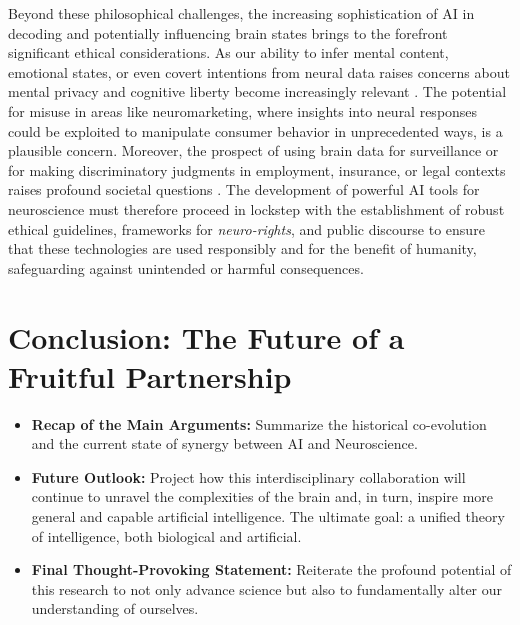 Beyond these philosophical challenges, the increasing sophistication of AI in decoding and potentially influencing brain states brings to the forefront significant ethical considerations. As our ability to infer mental content, emotional states, or even covert intentions from neural data raises concerns about mental privacy and cognitive liberty become increasingly relevant \cite{richards2019deep}. The potential for misuse in areas like neuromarketing, where insights into neural responses could be exploited to manipulate consumer behavior in unprecedented ways, is a plausible concern. Moreover, the prospect of using brain data for surveillance or for making discriminatory judgments in employment, insurance, or legal contexts raises profound societal questions \cite{miller2019explanation}. The development of powerful AI tools for neuroscience must therefore proceed in lockstep with the establishment of robust ethical guidelines, frameworks for \textit{neuro-rights}, and public discourse to ensure that these technologies are used responsibly and for the benefit of humanity, safeguarding against unintended or harmful consequences.

\section{Conclusion: The Future of a Fruitful Partnership}
\begin{itemize}
    \item \textbf{Recap of the Main Arguments:} Summarize the historical co-evolution and the current state of synergy between AI and Neuroscience.
    \item \textbf{Future Outlook:} Project how this interdisciplinary collaboration will continue to unravel the complexities of the brain and, in turn, inspire more general and capable artificial intelligence. The ultimate goal: a unified theory of intelligence, both biological and artificial.
    \item \textbf{Final Thought-Provoking Statement:} Reiterate the profound potential of this research to not only advance science but also to fundamentally alter our understanding of ourselves.
\end{itemize}

\clearpage